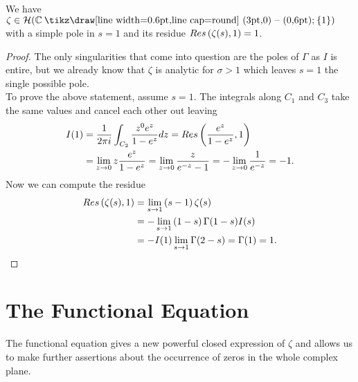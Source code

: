 \begin{theorem}
	We have $\zeta \in \mathcal{H}(\field{C} \mysetminus \fbr{1})$ with a simple pole in $s = 1$ and its residue $Res\left(\zeta(s), 1\right) = 1$.
\end{theorem}
\begin{proof}
	The only singularities that come into question are the poles of $\Gamma$ as $I$ is entire, but we already know that $\zeta$ is analytic for $\sigma > 1$ which leaves $s = 1$ the single possible pole. \\
	To prove the above statement, assume $s = 1$. The integrals along $C_1$ and $C_3$ take the same values and cancel each other out leaving
\begin{equation*}
\begin{aligned}
	I(1) 
	&= \frac{1}{2 \pi i} \int _{C_2} \frac{z^{0} e^z}{1 - e^z} dz = Res\left(\frac{e^z}{1 - e^z}, 1\right) \\
	&= \lim\limits _{z \to 0} z \frac{e^z}{1 - e^z} = \lim\limits _{z \to 0} \frac{z}{e^{-z} - 1} = -\lim\limits _{z \to 0} \frac{1}{e^{-z}} = -1.
\end{aligned}
\end{equation*}
	Now we can compute the residue
\begin{equation*}
\begin{aligned}	
	Res\left(\zeta(s), 1\right) 
	&= \lim\limits _{s \to 1} \left(s - 1\right) \zeta(s) \\
	&= -\lim\limits _{s \to 1} \left(1 - s\right) \Gamma(1 - s) I(s) \\
	&= -I(1) \lim\limits _{s \to 1} \Gamma(2 - s) = \Gamma(1) = 1.
\end{aligned}
\end{equation*}
\end{proof}


\section{The Functional Equation}
The functional equation gives a new powerful closed expression of $\zeta$ and allows us to make further assertions about the occurrence of zeros in the whole complex plane.


